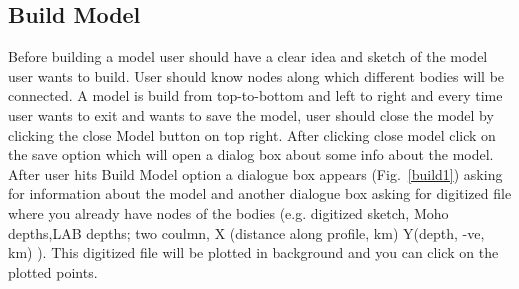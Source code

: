 \documentclass[14pt]{article}
\begin{document}
\subsection{Build Model}
Before building a model user should have a clear idea and sketch of the model user wants to build. User should know nodes along which different bodies will be connected. A model is build from top-to-bottom and left to right and every time user wants to exit and wants to save the model, user should close the model by clicking the close Model button on top right. After clicking close model click on the save option which will open a dialog box about some info about the model.\\
After user hits Build Model option a dialogue box appears (Fig.~\ref{build1})
asking for information about the model and another dialogue box asking for digitized file where you already have nodes of the bodies (e.g. digitized sketch, Moho depths,LAB depths; two coulmn, X (distance along profile, km) Y(depth, -ve, km) ). This digitized file will be plotted in background and you can click on the plotted points. 
\end{document}
